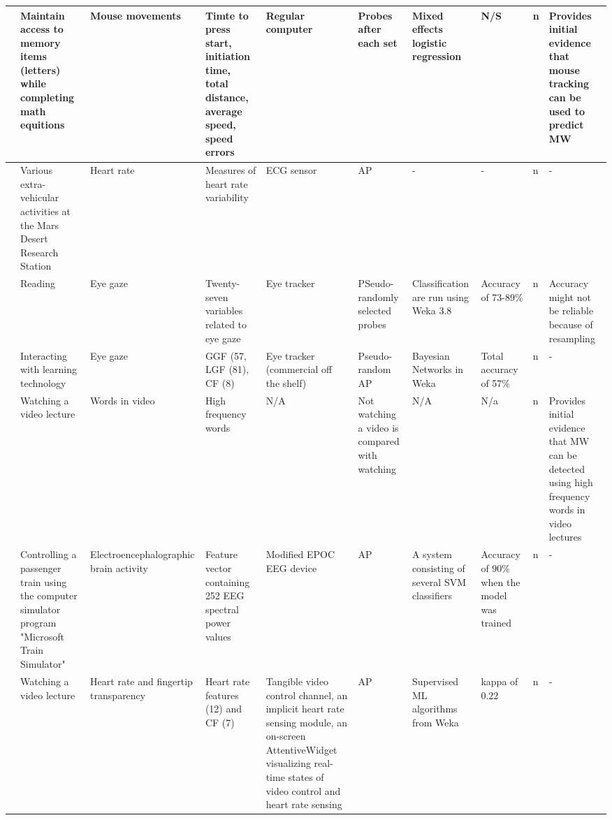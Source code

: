 \begin{landscape}
\begin{adjustwidth}{-2cm}{}
\begin{xtabular}{p{18mm}p{22mm}p{26mm}p{18mm}p{24mm}p{18mm}p{2cm}p{2cm}p{15mm}p{2cm}}
  \cite{DaSilva2018WanderingWandering}   &  Maintain access to memory items (letters) while completing math equitions & Mouse movements                      & Timte to press start, initiation time, total distance, average speed, speed errors & Regular computer & Probes after each set                     & Mixed effects logistic regression & N/S & n & Provides initial evidence that mouse tracking can be used to predict MW\\\hline
  \cite{Gontier2016HowEnvironment}        &  Various extra-vehicular activities at the Mars Desert Research Station  		& Heart rate                        & Measures of heart rate variability                                                 & ECG sensor  &  AP                                            & - & - & n & -\\\hline
  \cite{Gwizdka2019ExploringTasks}        &  Reading    		& Eye gaze                                                                                      & Twenty-seven variables related to eye gaze                                         & Eye tracker & PSeudo-randomly selected probes                & Classification are run using Weka 3.8 & Accuracy of 73-89\% & n & Accuracy might not be reliable because of resampling\\\hline
  \cite{Hutt2017OutClassroom}            &  Interacting with learning technology  		& Eye gaze                                                          & GGF (57, LGF (81), CF (8)                                                          & Eye tracker (commercial off the shelf) & Pseudo-random AP    & Bayesian Networks in Weka & Total accuracy of 57\% & n & -\\\hline
  \cite{Jo2017AMind}                      & Watching a video lecture & Words in video & High frequency words & N/A & Not watching a video is compared with watching & N/A & N/a & n & Provides initial evidence that MW can be detected using high frequency words in video lectures\\\hline
  \cite{Mishchenko2015DetectingTespiti}   & Controlling a passenger train using the computer simulator program "Microsoft Train Simulator" & Electroence\-phalographic brain activity & Feature vector containing 252 EEG spectral power values & Modified EPOC EEG device & AP & A system consisting of several SVM classifiers & Accuracy of 90\% when the model was trained & n & -\\\hline
  \cite{Pham2015Attentivelearner:Tracking} & Watching a video lecture & Heart rate and fingertip transparency & Heart rate features (12) and CF (7) & Tangible video control channel, an implicit heart rate sensing module, an on-screen AttentiveWidget visualizing real-time states of video control and heart rate sensing & AP & Supervised ML algorithms from Weka & kappa of 0.22 & n & -\\\hline

\end{xtabular}
\end{adjustwidth}
\end{landscape}
